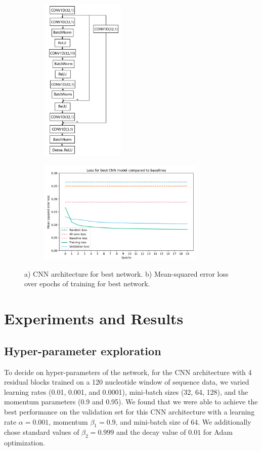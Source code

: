 \documentclass{article}
\begin{document}
\begin{figure}[H]
\centering
\begin{subfigure}{.2 \textwidth}
\centering
\caption{} \includegraphics[width=4cm]{../figures/cnn_architecture.png} 
\label{fig:architecture}
\end{subfigure}
\begin{subfigure}{.7 \textwidth}
\centering
\caption{}  \includegraphics[width=8cm]{../figures/loss.png} 
\label{fig:loss}
\end{subfigure}
\caption{a) CNN architecture for best network. b) Mean-squared error loss over epochs of training for best network.}
\end{figure}

\section{Experiments and Results}
\subsection{Hyper-parameter exploration}
To decide on hyper-parameters of the network, for the CNN architecture with 4 residual blocks trained on a 120 nucleotide window of sequence data, we varied learning rates (0.01, 0.001, and 0.0001), mini-batch sizes (32, 64, 128), and the momentum parameters (0.9 and 0.95). We found that we were able to achieve the best performance on the validation set for this CNN architecture with a learning rate $\alpha = 0.001$, momentum $\beta_1 = 0.9$, and mini-batch size of 64. We additionally chose standard values of $\beta_2 = 0.999$ and the decay value of $0.01$ for Adam optimization. 
\end{document}
